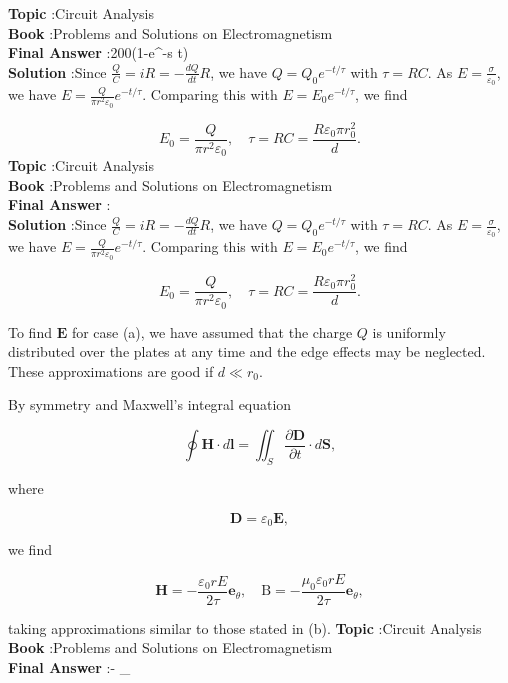 \documentclass[10pt]{article}
\begin{document}
\textbf{Topic} :Circuit Analysis\\
\textbf{Book} :Problems and Solutions on Electromagnetism\\
\textbf{Final Answer} :200\left(1-e^{-s t}\right) \\


\textbf{Solution} :Since $\frac{Q}{C}=i R=-\frac{d Q}{d t} R$, we have $Q=Q_{0} e^{-t / \tau}$ with $\tau=R C$. As $E=\frac{\sigma}{\varepsilon_{0}}$, we have $E=\frac{Q}{\pi r^{2} \varepsilon_{0}} e^{-t / \tau}$. Comparing this with $E=E_{0} e^{-t / \tau}$, we find

$$
E_{0}=\frac{Q}{\pi r^{2} \varepsilon_{0}}, \quad \tau=R C=\frac{R \varepsilon_{0} \pi r_{0}^{2}}{d} .
$$
\textbf{Topic} :Circuit Analysis\\
\textbf{Book} :Problems and Solutions on Electromagnetism\\
\textbf{Final Answer} :\\


\textbf{Solution} :Since $\frac{Q}{C}=i R=-\frac{d Q}{d t} R$, we have $Q=Q_{0} e^{-t / \tau}$ with $\tau=R C$. As $E=\frac{\sigma}{\varepsilon_{0}}$, we have $E=\frac{Q}{\pi r^{2} \varepsilon_{0}} e^{-t / \tau}$. Comparing this with $E=E_{0} e^{-t / \tau}$, we find

$$
E_{0}=\frac{Q}{\pi r^{2} \varepsilon_{0}}, \quad \tau=R C=\frac{R \varepsilon_{0} \pi r_{0}^{2}}{d} .
$$

 To find $\mathbf{E}$ for case (a), we have assumed that the charge $Q$ is uniformly distributed over the plates at any time and the edge effects may be neglected. These approximations are good if $d \ll r_{0}$.

 By symmetry and Maxwell's integral equation

$$
\oint \mathbf{H} \cdot d \mathbf{l}=\iint_{S} \frac{\partial \mathbf{D}}{\partial t} \cdot d \mathbf{S},
$$

where

$$
\mathbf{D}=\varepsilon_{0} \mathbf{E},
$$

we find

$$
\mathbf{H}=-\frac{\varepsilon_{0} r E}{2 \tau} \mathbf{e}_{\theta}, \quad \mathrm{B}=-\frac{\mu_{0} \varepsilon_{0} r E}{2 \tau} \mathbf{e}_{\theta},
$$

taking approximations similar to those stated in (b).
\textbf{Topic} :Circuit Analysis\\
\textbf{Book} :Problems and Solutions on Electromagnetism\\
\textbf{Final Answer} :- _{\theta}\\
\end{document}
